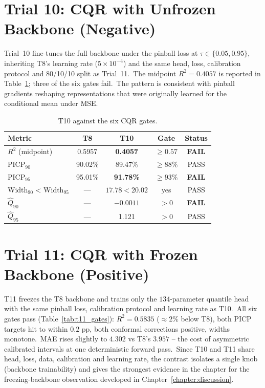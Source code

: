 \section{Trial 10: CQR with Unfrozen Backbone (Negative)}\label{sec:t10_results}

Trial~10 fine-tunes the full backbone under the pinball loss at $\tau \in \{0.05, 0.95\}$, inheriting T8's learning rate ($5 \times 10^{-4}$) and the same head, loss, calibration protocol and 80/10/10 split as Trial~11.\ The midpoint $R^2 = 0.4057$ is reported in Table~\ref{tab:t10_gates}; three of the six gates fail.\ The pattern is consistent with pinball gradients reshaping representations that were originally learned for the conditional mean under MSE.

\begin{table}[htbp]
\centering
\caption[Trial 10 gate check]{T10 against the six CQR gates.}
\label{tab:t10_gates}
\begin{tabular}{lcccc}
\toprule
Metric & T8 & T10 & Gate & Status \\
\midrule
$R^2$ (midpoint) & 0.5957 & \textbf{0.4057} & $\geq 0.57$ & \textbf{FAIL} \\
PICP$_{90}$ & 90.02\% & 89.47\% & $\geq 88\%$ & PASS \\
PICP$_{95}$ & 95.01\% & \textbf{91.78\%} & $\geq 93\%$ & \textbf{FAIL} \\
Width$_{90}$ < Width$_{95}$ & --- & $17.78 < 20.02$ & yes & PASS \\
$\hat Q_{90}$ & --- & \textbf{$-0.0011$} & $> 0$ & \textbf{FAIL} \\
$\hat Q_{95}$ & --- & 1.121 & $> 0$ & PASS \\
\bottomrule
\end{tabular}
\end{table}

\section{Trial 11: CQR with Frozen Backbone (Positive)}\label{sec:t11_results}

T11 freezes the T8 backbone and trains only the $134$-parameter quantile head with the same pinball loss, calibration protocol and learning rate as T10.\ All six gates pass (Table~\ref{tab:t11_gates}): $R^2 = 0.5835$ ($\approx 2\%$ below T8), both PICP targets hit to within $0.2$ pp, both conformal corrections positive, widths monotone.\ MAE rises slightly to $4.302$ vs T8's $3.957$ -- the cost of asymmetric calibrated intervals at one deterministic forward pass.\ Since T10 and T11 share head, loss, data, calibration and learning rate, the contrast isolates a single knob (backbone trainability) and gives the strongest evidence in the chapter for the freezing-backbone observation developed in Chapter~\ref{chapter:discussion}.

